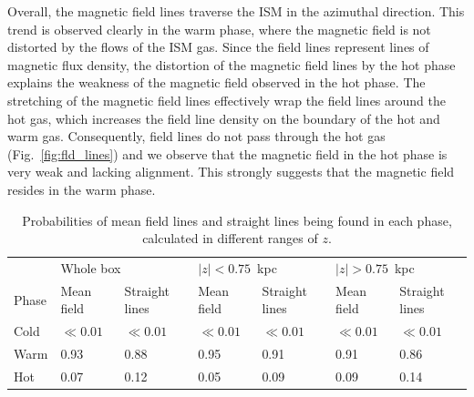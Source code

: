 \documentclass[useAMS,usenatbib]{mn2e}
\begin{document}
Overall, the magnetic field lines traverse the ISM in the azimuthal direction. This trend is observed clearly in the warm phase, where the magnetic field is not distorted by the flows of the ISM gas. Since the field lines represent lines of magnetic flux density, the distortion of the magnetic field lines by the hot phase explains the weakness of the magnetic field observed in the hot phase. The stretching of the magnetic field lines effectively wrap the field lines around the hot gas, which increases the field line density on the boundary of the hot and warm gas. 
Consequently, field lines do not pass through the hot gas  (Fig.~\ref{fig:fld_lines}) and we observe that the magnetic field in the hot 
phase is very weak and lacking alignment. 
This strongly suggests that the magnetic field resides in the warm phase.    
\begin{table}
\centering
\caption{Probabilities of mean field lines and straight lines being found in each phase, calculated in different ranges of $z$.}
\label{tab:pdf0_probs}
\begin{tabular}{lllllll}
      & \multicolumn{2}{l}{Whole box} & \multicolumn{2}{l}{$|z|<0.75$~kpc} & \multicolumn{2}{l}{$|z|>0.75$~kpc} \\ \cline{2-7} 
Phase & Mean field      & Straight lines        & Mean field         & Straight lines          & Mean field         & Straight lines          \\ \hline\hline
Cold  & $\ll 0.01$    & $\ll 0.01$    & $\ll 0.01$       & $\ll 0.01$      & $\ll 0.01$       & $\ll 0.01$      \\
Warm  & 0.93          & 0.88          & 0.95             & 0.91            & 0.91             & 0.86            \\
Hot   & 0.07          & 0.12          & 0.05             & 0.09            & 0.09             & 0.14            \\ \hline
\end{tabular}
\end{table}
\end{document}
